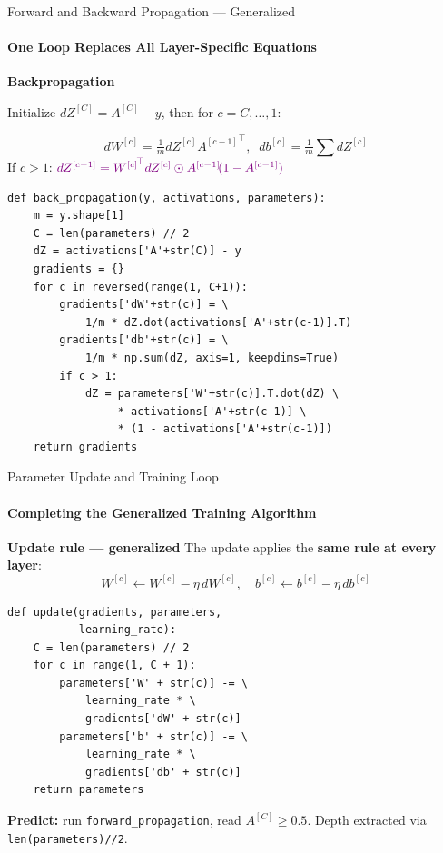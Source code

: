 \documentclass[aspectratio=169]{beamer}
\begin{document}
%
%
\begin{frame}[fragile]{Forward and Backward Propagation --- Generalized}
\framesubtitle{One Loop Replaces All Layer-Specific Equations}

\textbf{\small Backpropagation}

{\small Initialize $dZ^{[C]} = A^{[C]} - y$, then for $c = C, \dots, 1$:}

{\small
\[
\boxed{dW^{[c]} \!=\! \tfrac{1}{m} dZ^{[c]} {A^{[c-1]}}^{\!\top}\!, \;\; db^{[c]} \!=\! \tfrac{1}{m} \textstyle\sum dZ^{[c]}}
\]
}
{\small If $c > 1$: \; ${\color{layer1violet}dZ^{[c-1]} = {W^{[c]}}^{\!\top} dZ^{[c]} \odot A^{[c-1]}\!(1 - A^{[c-1]})}$}

{
\begin{lstlisting}
def back_propagation(y, activations, parameters):
    m = y.shape[1]
    C = len(parameters) // 2
    dZ = activations['A'+str(C)] - y
    gradients = {}
    for c in reversed(range(1, C+1)):
        gradients['dW'+str(c)] = \
            1/m * dZ.dot(activations['A'+str(c-1)].T)
        gradients['db'+str(c)] = \
            1/m * np.sum(dZ, axis=1, keepdims=True)
        if c > 1:
            dZ = parameters['W'+str(c)].T.dot(dZ) \
                 * activations['A'+str(c-1)] \
                 * (1 - activations['A'+str(c-1)])
    return gradients
\end{lstlisting}
}

\end{frame}
%
%
\begin{frame}[fragile]{Parameter Update and Training Loop}
\framesubtitle{Completing the Generalized Training Algorithm}

\textbf{\small Update rule --- generalized}
{\small The update applies the \textbf{same rule at every layer}:}
{\small
\[
\boxed{W^{[c]} \leftarrow W^{[c]} - \eta\, dW^{[c]}, \quad b^{[c]} \leftarrow b^{[c]} - \eta\, db^{[c]}}
\]
}
\begin{lstlisting}
def update(gradients, parameters, 
           learning_rate):
    C = len(parameters) // 2
    for c in range(1, C + 1):
        parameters['W' + str(c)] -= \
            learning_rate * \
            gradients['dW' + str(c)]
        parameters['b' + str(c)] -= \
            learning_rate * \
            gradients['db' + str(c)]
    return parameters
\end{lstlisting}

\vspace{0.05cm}

{\scriptsize\colorbox{blue!8}{\parbox{0.92\linewidth}{%
\textbf{Predict:} run \texttt{forward\_propagation}, read $A^{[C]} \!\geq\! 0.5$. Depth extracted via \texttt{len(parameters)//2}.}}}

\end{frame}
\end{document}
